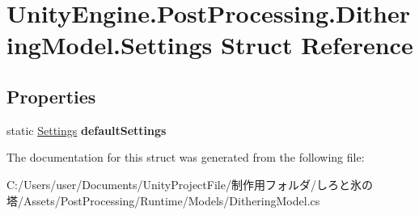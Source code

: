 \hypertarget{struct_unity_engine_1_1_post_processing_1_1_dithering_model_1_1_settings}{}\section{Unity\+Engine.\+Post\+Processing.\+Dithering\+Model.\+Settings Struct Reference}
\label{struct_unity_engine_1_1_post_processing_1_1_dithering_model_1_1_settings}
\subsection*{Properties}
\begin{DoxyCompactItemize}
\item 
\mbox{\label{struct_unity_engine_1_1_post_processing_1_1_dithering_model_1_1_settings_a3eb701066dfc32db93f8aa3bfa540b1a}} 
static \hyperlink{struct_unity_engine_1_1_post_processing_1_1_dithering_model_1_1_settings}{Settings} {\bfseries default\+Settings}
\end{DoxyCompactItemize}


The documentation for this struct was generated from the following file\+:\begin{DoxyCompactItemize}
\item 
C\+:/\+Users/user/\+Documents/\+Unity\+Project\+File/制作用フォルダ/しろと氷の塔/\+Assets/\+Post\+Processing/\+Runtime/\+Models/Dithering\+Model.\+cs\end{DoxyCompactItemize}

